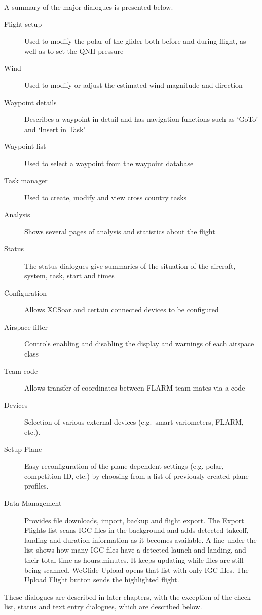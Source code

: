 A summary of the major dialogues is presented below.
\begin{description}
\item[Flight setup] Used to modify the polar of the glider both before and
during flight, as well as to set the QNH pressure
\item[Wind] Used to modify or adjust the estimated wind magnitude and direction
\item[Waypoint details] Describes a waypoint in detail and has navigation
functions such as `GoTo' and `Insert in Task'
\item[Waypoint list] Used to select a waypoint from the waypoint database
\item[Task manager] Used to create, modify and view cross country tasks
\item[Analysis] Shows several pages of analysis and statistics about the flight
\item[Status] The status dialogues give summaries of the situation of the 
aircraft, system, task, start and times
\item[Configuration] Allows XCSoar and certain connected devices to be
configured
\item[Airspace filter] Controls enabling and disabling the display and warnings
of each airspace class
\item[Team code] Allows transfer of coordinates between FLARM team mates via a 
  code
\item[Devices]  Selection of various external devices (e.g.\ smart variometers,
  FLARM, etc.).
\item[Setup Plane]  Easy reconfiguration of the plane-dependent settings (e.g. 
  polar, competition ID, etc.) by choosing from a list of previously-created 
  plane profiles.
\item[Data Management] Provides file downloads, import, backup and flight
  export.  The Export Flights list scans IGC files in the background and adds
  detected takeoff, landing and duration information as it becomes available.
  A line under the list shows how many IGC files have a detected launch and
  landing, and their total time as hours:minutes. It keeps updating while
  files are still being scanned.
  WeGlide Upload opens that
  list with only IGC files. The Upload Flight button sends the
  highlighted flight.
\end{description}

These dialogues are described in later chapters, with the exception of the
check-list, status and text entry dialogues, which are described below.


